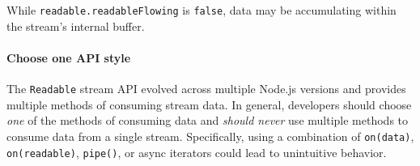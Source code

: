 \begin{Shaded}
\begin{Highlighting}[]
\OperatorTok{,}\OperatorTok{=} \NormalTok{(}\NormalTok{)}\OperatorTok{;}
\OperatorTok{=}  \NormalTok{()}\OperatorTok{;}
\OperatorTok{=}  \NormalTok{()}\OperatorTok{;}

\OperatorTok{;}
\OperatorTok{;}

\NormalTok{(}\OperatorTok{,}\KeywordTok{=\textgreater{}}\NormalTok{ \{ }\NormalTok{())}\OperatorTok{;}\NormalTok{ \})}\OperatorTok{;}
\NormalTok{(}\NormalTok{)}\OperatorTok{;}  
\NormalTok{()}\OperatorTok{;}     
\end{Highlighting}
\end{Shaded}

While \texttt{readable.readableFlowing} is \texttt{false}, data may be
accumulating within the stream's internal buffer.

\paragraph{Choose one API style}\label{choose-one-api-style}

The \texttt{Readable} stream API evolved across multiple Node.js
versions and provides multiple methods of consuming stream data. In
general, developers should choose \emph{one} of the methods of consuming
data and \emph{should never} use multiple methods to consume data from a
single stream. Specifically, using a combination of
\texttt{on(\textquotesingle{}data\textquotesingle{})},
\texttt{on(\textquotesingle{}readable\textquotesingle{})},
\texttt{pipe()}, or async iterators could lead to unintuitive behavior.

